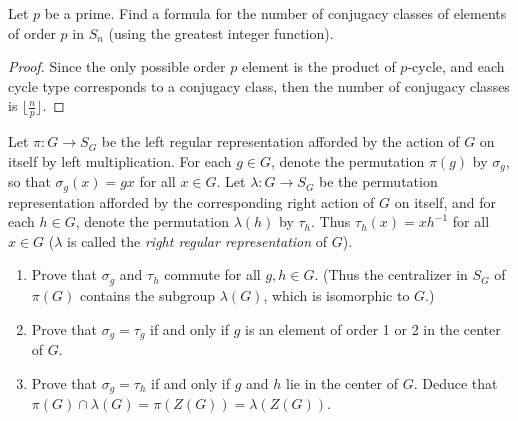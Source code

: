 \documentclass{article}
\newenvironment{problem}[2][Problem]{\begin{trivlist}
\item[\hskip \labelsep {\bfseries #1}\hskip \labelsep {\bfseries #2.}]}{\end{trivlist}}
\begin{document}
\begin{problem}{35}
    Let $p$ be a prime. Find a formula for the number of conjugacy classes of elements of order $p$ in $S_n$ (using the greatest integer function).

\end{problem}
\begin{proof}
    Since the only possible order $p$ element is the product of $p$-cycle, and each cycle type corresponds to a conjugacy class, then the number of conjugacy classes is $\lfloor \frac{n}{p} \rfloor$.
\end{proof}
\begin{problem}{36}
        \item Let \( \pi: G \to S_G \) be the left regular representation afforded by the action of \( G \) on itself by left multiplication. For each \( g \in G \), denote the permutation \( \pi(g) \) by \( \sigma_g \), so that \( \sigma_g(x) = g x \) for all \( x \in G \). Let \( \lambda: G \to S_G \) be the permutation representation afforded by the corresponding right action of \( G \) on itself, and for each \( h \in G \), denote the permutation \( \lambda(h) \) by \( \tau_h \). Thus \( \tau_h(x) = x h^{-1} \) for all \( x \in G \) (\( \lambda \) is called the \textit{right regular representation} of \( G \)).

    \begin{enumerate}
        \item[(a)] Prove that \( \sigma_g \) and \( \tau_h \) commute for all \( g, h \in G \). (Thus the centralizer in \( S_G \) of \( \pi(G) \) contains the subgroup \( \lambda(G) \), which is isomorphic to \( G \).)
        \item[(b)] Prove that \( \sigma_g = \tau_g \) if and only if \( g \) is an element of order 1 or 2 in the center of \( G \).
        \item[(c)] Prove that \( \sigma_g = \tau_h \) if and only if \( g \) and \( h \) lie in the center of \( G \). Deduce that \( \pi(G) \cap \lambda(G) = \pi(Z(G)) = \lambda(Z(G)) \).
    \end{enumerate}
\end{problem}
\end{document}
